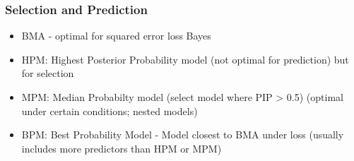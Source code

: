 \documentclass[]{beamer}\usepackage[]{graphicx}\usepackage[]{color}
\makeatletter
\def\maxwidth{ %
  \ifdim\Gin@nat@width>\linewidth
    \linewidth
  \else
    \Gin@nat@width
  \fi
}
\newcommand{\hlnum}[1]{\textcolor[rgb]{0.686,0.059,0.569}{#1}}%
\newcommand{\hlopt}[1]{\textcolor[rgb]{0,0,0}{#1}}%
\newcommand{\hlstd}[1]{\textcolor[rgb]{0.345,0.345,0.345}{#1}}%
\newcommand{\hlkwb}[1]{\textcolor[rgb]{0.69,0.353,0.396}{#1}}%
\newcommand{\hlkwc}[1]{\textcolor[rgb]{0.333,0.667,0.333}{#1}}%
\newcommand{\hlkwd}[1]{\textcolor[rgb]{0.737,0.353,0.396}{\textbf{#1}}}%
\newenvironment{kframe}{%
 \def\at@end@of@kframe{}%
 \ifinner\ifhmode%
  \def\at@end@of@kframe{\end{minipage}}%
  \begin{minipage}{\columnwidth}%
 \fi\fi%
 \def\FrameCommand##1{\hskip\@totalleftmargin \hskip-\fboxsep
 \colorbox{shadecolor}{##1}\hskip-\fboxsep
     \hskip-\linewidth \hskip-\@totalleftmargin \hskip\columnwidth}%
 \MakeFramed {\advance\hsize-\width
   \@totalleftmargin\z@ \linewidth\hsize
   \@setminipage}}%
 {\par\unskip\endMakeFramed%
 \at@end@of@kframe}
\newenvironment{knitrout}{}{} %
\makeatother
\begin{document}

\begin{frame}\frametitle{Selection and Prediction}

\begin{itemize}
  \item  BMA  - optimal for squared error loss Bayes
  \item  HPM: Highest Posterior Probability model (not optimal for prediction) but for selection

\item MPM: Median Probabilty model (select model where PIP > 0.5)
 (optimal under certain conditions; nested models)

\item BPM: Best Probability Model - Model closest to BMA under loss
      (usually includes more predictors than HPM or MPM)
\end{itemize}

\end{frame}
\end{document}
